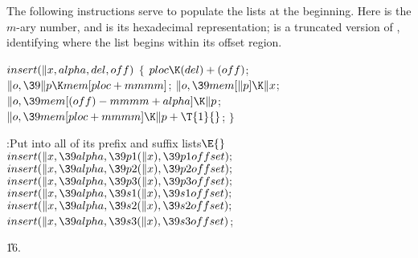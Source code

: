 The following instructions serve to populate the lists at the beginning.
Here  is the $m$-ary number, and  is its hexadecimal
representation;
 is a truncated version of , identifying where the
list
begins within its offset region.

\Y\B\4\D$\\{insert}(\|x,\\{alpha},\\{del},\\{off})$ \6
${}\{{}$\1\6
${}\\{ploc}\K(\\{del})+(\\{off}){}$;\6
${}\|o,\39\|p\K\\{mem}[\\{ploc}+\\{mmmm}]{}$;\6
${}\|o,\39\\{mem}[\|p]\K\|x{}$;\6
${}\|o,\39\\{mem}[(\\{off})-\\{mmmm}+\\{alpha}]\K\|p{}$;\6
${}\|o,\39\\{mem}[\\{ploc}+\\{mmmm}]\K\|p+\T{1}{}$;\6
\4${}\}{}$\2\par
\Y\B\4:Put  into all of its prefix and suffix lists\X${}\E{}$%
\6
$\\{insert}(\|x,\39\\{alpha},\39\\{p1}(\|x),\39\\{p1offset});{}$\6
${}\\{insert}(\|x,\39\\{alpha},\39\\{p2}(\|x),\39\\{p2offset});{}$\6
${}\\{insert}(\|x,\39\\{alpha},\39\\{p3}(\|x),\39\\{p3offset});{}$\6
${}\\{insert}(\|x,\39\\{alpha},\39\\{s1}(\|x),\39\\{s1offset});{}$\6
${}\\{insert}(\|x,\39\\{alpha},\39\\{s2}(\|x),\39\\{s2offset});{}$\6
${}\\{insert}(\|x,\39\\{alpha},\39\\{s3}(\|x),\39\\{s3offset}){}$;\par
\U16.\fi

